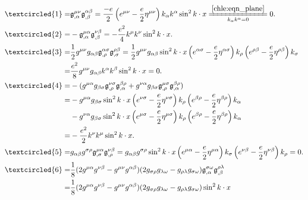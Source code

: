 \begin{align*}
	{\textcircled{1}} = & \mathfrak{g}^{\mu \nu}_{,\alpha}\mathfrak{g}^{\alpha \beta}_{,\beta}
	= \frac{-e}{2} \left(e^{\mu \nu}-\frac{e}{2}\eta^{\mu \nu}\right) k_\alpha  k^{\alpha} \sin^2 k\cdot x
	\xlongequal[ k_\alpha  k^{\alpha}=0]{\ref{chle:eqn_plane}} 0 . \\
	{\textcircled{2}} = & - \mathfrak{g}^{\mu \alpha}_{,\alpha}\mathfrak{g}^{\nu \beta}_{,\beta}
	=-\frac{e^2}{4} k^{\mu} k^{\nu}\sin^2 k\cdot x . \\
	{\textcircled{3}} = &\frac{1}{2}g^{\mu \nu}g_{\alpha \beta}\mathfrak{g}^{\alpha \sigma}_{,\rho}	\mathfrak{g}^{\rho \beta}_{,\sigma}
	= \frac{1}{2}g^{\mu \nu}g_{\alpha \beta} \sin^2 k\cdot x
	\left(e^{\alpha\sigma}-\frac{e}{2}\eta^{\alpha\sigma}\right) k_\rho
	\left(e^{\rho\beta}-\frac{e}{2}\eta^{\rho\beta}\right) k_\sigma \\
	=&\frac{e^2}{8}g^{\mu \nu}g_{\alpha \beta} 
	k^{\alpha}k^{\beta} \sin^2 k\cdot x = 0 .\\
	{\textcircled{4}} =&-( g^{\mu \alpha}g_{\beta \sigma}\mathfrak{g}^{\nu \sigma}_{,\rho}
	\mathfrak{g}^{\beta \rho}_{,\alpha}+g^{\nu \alpha}g_{\beta \sigma}
	\mathfrak{g}^{\mu \sigma}_{,\rho}\mathfrak{g}^{\beta \rho}_{,\alpha}) \\
	=& -g^{\mu \alpha}g_{\beta \sigma} \sin^2 k\cdot x 
	\left(e^{\nu \sigma}-\frac{e}{2}\eta^{\nu \sigma}\right) k_\rho
	\left(e^{\beta \rho}-\frac{e}{2}\eta^{\beta \rho}\right) k_\alpha \\
	&-g^{\nu \alpha}g_{\beta \sigma} \sin^2 k\cdot x 
	\left(e^{\mu \sigma}-\frac{e}{2}\eta^{\mu \sigma}\right) k_\rho
	\left(e^{\beta \rho}-\frac{e}{2}\eta^{\beta \rho}\right) k_\alpha \\
	=& -\frac{e^2}{2} k^{\nu} k^\mu \sin^2 k\cdot x 	. \\
	{\textcircled{5}} =&g_{\alpha \beta}g^{\sigma \rho}\mathfrak{g}^{\mu \alpha}_{,\sigma}	\mathfrak{g}^{\nu \beta}_{,\rho} 
	= g_{\alpha \beta}g^{\sigma \rho} \sin^2 k\cdot x 
	\left(e^{\mu \alpha}-\frac{e}{2}\eta^{\mu \alpha}\right) k_\sigma  
	\left(e^{\nu \beta}-\frac{e}{2}\eta^{\nu \beta}\right) k_\rho 	= 0 .\\
	{\textcircled{6}} =&\frac{1}{8}(2g^{\mu \alpha}g^{\nu \beta}-g^{\mu \nu}g^{\alpha \beta})
	(2g_{\sigma \rho}g_{\lambda \omega}-g_{\rho \lambda}g_{\sigma \omega})
	\mathfrak{g}^{\sigma \omega}_{,\alpha}\mathfrak{g}^{\rho \lambda}_{,\beta}\\
	=&\frac{1}{8}(2g^{\mu \alpha}g^{\nu \beta}-g^{\mu \nu}g^{\alpha \beta})
	(2g_{\sigma \rho}g_{\lambda \omega}-g_{\rho \lambda}g_{\sigma \omega}) \sin^2 k\cdot x 

\end{align*}
